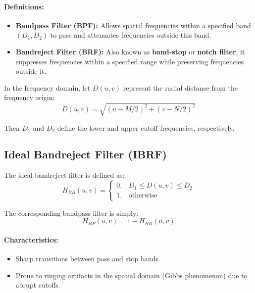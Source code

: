 \documentclass[12pt,a4paper]{AnantDocumentation}
\begin{document}
\paragraph{Definitions:}
\begin{itemize}
\item \textbf{Bandpass Filter (BPF):} Allows spatial frequencies within a specified band $(D_1, D_2)$ to pass and attenuates frequencies outside this band.
\item \textbf{Bandreject Filter (BRF):} Also known as \textbf{band-stop} or \textbf{notch filter}, it suppresses frequencies within a specified range while preserving frequencies outside it.
\end{itemize}

In the frequency domain, let $D(u, v)$ represent the radial distance from the frequency origin:
\begin{equation}
D(u, v) = \sqrt{(u - M/2)^2 + (v - N/2)^2}
\end{equation}

Then $D_1$ and $D_2$ define the lower and upper cutoff frequencies, respectively.

\subsection{Ideal Bandreject Filter (IBRF)}

The ideal bandreject filter is defined as:
\begin{equation}
H_{BR}(u, v) =
\begin{cases}
0, & D_1 \le D(u, v) \le D_2 \\
1, & \text{otherwise}
\end{cases}
\end{equation}

The corresponding bandpass filter is simply:
\begin{equation}
H_{BP}(u, v) = 1 - H_{BR}(u, v)
\end{equation}

\paragraph{Characteristics:}
\begin{itemize}
\item Sharp transitions between pass and stop bands.
\item Prone to ringing artifacts in the spatial domain (Gibbs phenomenon) due to abrupt cutoffs.
\end{itemize}
\end{document}
